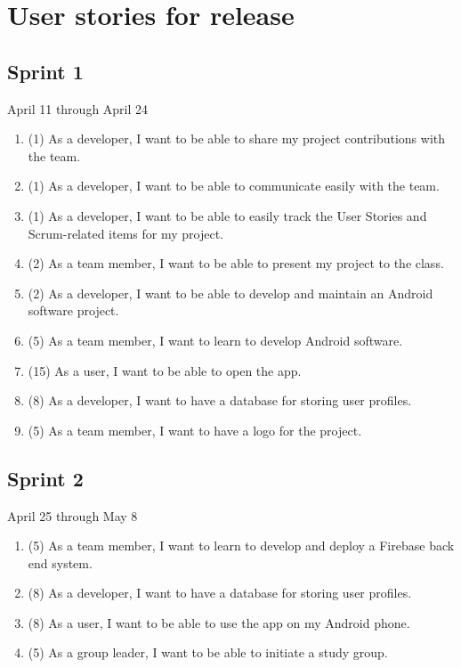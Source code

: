 \documentclass[10pt]{article}
\begin{document}
    \section{User stories for release}

    \subsection{Sprint 1}
    April 11 through April 24
    \begin{enumerate}
        \item (1) As a developer, I want to be able to share my project contributions with the team.
        \item (1) As a developer, I want to be able to communicate easily with the team.
        \item (1) As a developer, I want to be able to easily track the User Stories and Scrum-related items for my project.
        \item (2) As a team member, I want to be able to present my project to the class.
        \item (2) As a developer, I want to be able to develop and maintain an Android software project.
        \item (5) As a team member, I want to learn to develop Android software.
        \item (15) As a user, I want to be able to open the app.
        \item (8) As a developer, I want to have a database for storing user profiles.
        \item (5) As a team member, I want to have a logo for the project.
    \end{enumerate}

    \subsection{Sprint 2}
    April 25 through May 8
    \begin{enumerate}
        \item (5) As a team member, I want to learn to develop and deploy a Firebase back end system.
        \item (8) As a developer, I want to have a database for storing user profiles.
        \item (8) As a user, I want to be able to use the app on my Android phone.
        \item (5) As a group leader, I want to be able to initiate a study group.
    \end{enumerate}
    
\end{document}
